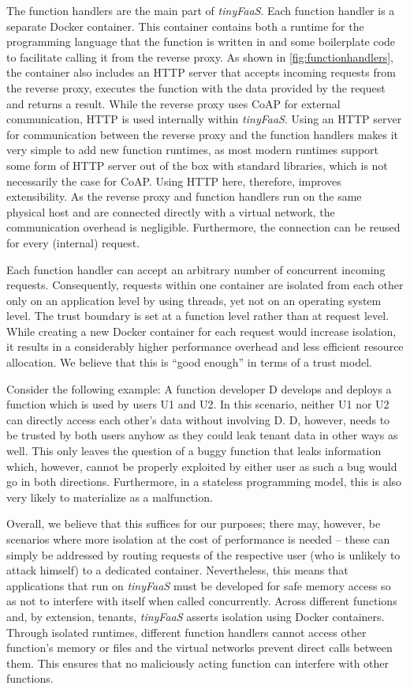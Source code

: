 The function handlers are the main part of \textit{tinyFaaS}.
Each function handler is a separate Docker container.
This container contains both a runtime for the programming language that the function is written in and some boilerplate code to facilitate calling it from the reverse proxy.
As shown in \cref{fig:functionhandlers}, the container also includes an HTTP server that accepts incoming requests from the reverse proxy, executes the function with the data provided by the request and returns a result.
While the reverse proxy uses CoAP for external communication, HTTP is used internally within \textit{tinyFaaS}.
Using an HTTP server for communication between the reverse proxy and the function handlers makes it very simple to add new function runtimes, as most modern runtimes support some form of HTTP server out of the box with standard libraries, which is not necessarily the case for CoAP.
Using HTTP here, therefore, improves extensibility.
As the reverse proxy and function handlers run on the same physical host and are connected directly with a virtual network, the communication overhead is negligible.
Furthermore, the connection can be reused for every (internal) request.

Each function handler can accept an arbitrary number of concurrent incoming requests.
Consequently, requests within one container are isolated from each other only on an application level by using threads, yet not on an operating system level.
The trust boundary is set at a function level rather than at request level.
While creating a new Docker container for each request would increase isolation, it results in a considerably higher performance overhead and less efficient resource allocation.
We believe that this is ``good enough'' in terms of a trust model.

Consider the following example: A function developer D develops and deploys a function which is used by users U1 and U2.
In this scenario, neither U1 nor U2 can directly access each other's data without involving D.
D, however, needs to be trusted by both users anyhow as they could leak tenant data in other ways as well.
This only leaves the question of a buggy function that leaks information which, however, cannot be properly exploited by either user as such a bug would go in both directions.
Furthermore, in a stateless programming model, this is also very likely to materialize as a malfunction.

Overall, we believe that this suffices for our purposes; there may, however, be scenarios where more isolation at the cost of performance is needed -- these can simply be addressed by routing requests of the respective user (who is unlikely to attack himself) to a dedicated container.
Nevertheless, this means that applications that run on \textit{tinyFaaS} must be developed for safe memory access so as not to interfere with itself when called concurrently.
Across different functions and, by extension, tenants, \textit{tinyFaaS} asserts isolation using Docker containers.
Through isolated runtimes, different function handlers cannot access other function's memory or files and the virtual networks prevent direct calls between them.
This ensures that no maliciously acting function can interfere with other functions.


